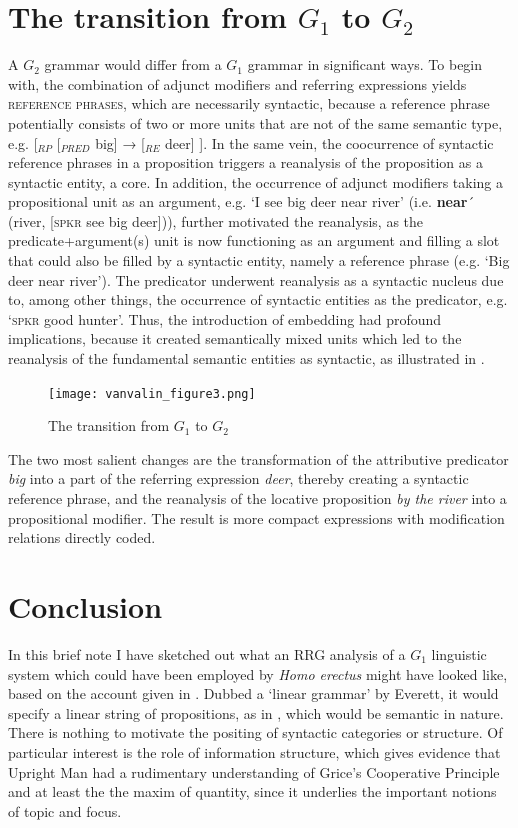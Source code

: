 \documentclass[output=paper,colorlinks,citecolor=brown]{langscibook}
\begin{document}
\section{The transition from $G_1$ to $G_2$}\label{sec:vanvalin:5}

A $G_2$ grammar would differ from a $G_1$ grammar in significant ways.  To begin with, the combination of adjunct modifiers and referring expressions yields \textsc{reference phrases}, which are necessarily syntactic, because a reference phrase potentially consists of two or more units that are not of the same semantic type, e.g. [$_{RP}$ [$_{PRED}$ big] → [$_{RE}$ deer] ].  In the same vein, the coocurrence of syntactic reference phrases in a proposition triggers a reanalysis of the proposition as a syntactic entity, a core.  In addition, the occurrence of adjunct modifiers taking a propositional unit as an argument, e.g. ‘I see big deer near river’ (i.e. \textbf{near}´ (river, [\textsc{spkr} see big deer])), further motivated the reanalysis, as the predicate+argument(s) unit is now functioning as an argument and filling a slot that could also be filled by a syntactic entity, namely a reference phrase (e.g. ‘Big deer near river’).  The predicator underwent reanalysis as a syntactic nucleus due to, among other things, the occurrence of syntactic entities as the predicator, e.g. ‘\textsc{spkr} good hunter’.  Thus, the introduction of embedding had profound implications, because it created semantically mixed units which led to the reanalysis of the fundamental semantic entities as syntactic, as illustrated in .

\begin{figure}
\centering
\texttt{[image: vanvalin\_figure3.png]}
\caption{\label{fig:fig3}The transition from $G_1$ to $G_2$}
\end{figure}

The two most salient changes are the transformation of the attributive predicator \textit{big} into a part of the referring expression \emph{deer}, thereby creating a syntactic reference phrase, and the reanalysis of the locative proposition \emph{by the river} into a propositional modifier.  The result is more compact expressions with modification relations directly coded.  

\section{Conclusion}\label{sec:vanvalin:6}
In this brief note I have sketched out what an RRG analysis of a $G_1$ linguistic system which could have been employed by \emph{Homo erectus} might have looked like, based on the account given in \citet{everett2017language}.  Dubbed a ‘linear grammar’ by Everett, it would specify a linear string of propositions, as in , which would be semantic in nature.  There is nothing to motivate the positing of syntactic categories or structure.  Of particular interest is the role of information structure, which gives evidence that Upright Man had a rudimentary understanding of Grice’s Cooperative Principle and at least the the maxim of quantity, since it underlies the important notions of topic and focus.  
\end{document}
